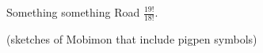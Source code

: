 

Something something Road \(\frac{19!}{18!}\).

(sketches of Mobimon that include pigpen symbols)


